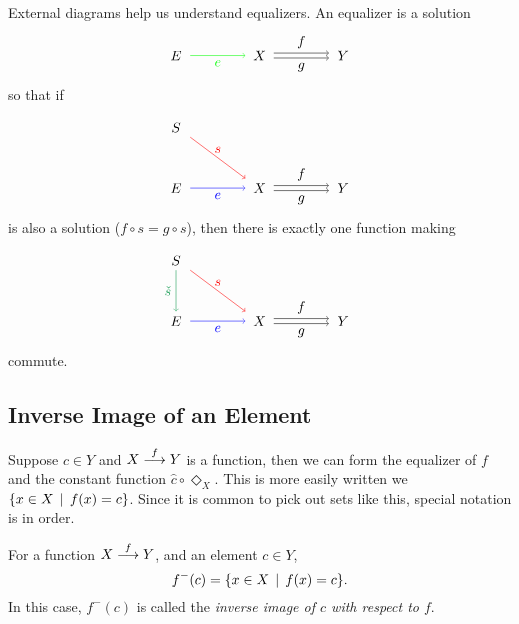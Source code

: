 External diagrams help us understand equalizers. 
An equalizer is a solution
\[
\begin{tikzpicture}
\matrix (m) [row sep=3em,column sep=4em,minimum width=2em]
{
	\node (E) {$E$}; & \node (A) {$X$}; & \node (B) {$Y$};\\
};
\draw[->, green] (E.east) -- node[anchor=north] {$e$} (A.west); 
\draw[->] (A.10) -- node[anchor=south]  {$f$} (B.170) ;
\draw[->] (A.350) -- node[anchor=north]  {$g$} (B.190);
\end{tikzpicture}
\]
so that if 
\[
\begin{tikzpicture}
\matrix (m) [row sep=3em,column sep=4em,minimum width=2em]
{
	\node (S) {$S$};\\
	\node (E) {$E$}; & \node (A) {$X$}; & \node (B) {$Y$};\\
};
\draw[->, red] (S.south east) -- node[anchor=south] {$s$} (A.north west);
\draw[->, blue] (E.east) -- node[anchor=north] {$e$} (A.west); 
\draw[->] (A.10) -- node[anchor=south]  {$f$} (B.170) ;
\draw[->] (A.350) -- node[anchor=north]  {$g$} (B.190);
\end{tikzpicture}
\]
is also a solution ($f\circ s=g\circ s$), then there is exactly one function making
\[
\begin{tikzpicture}
\matrix (m) [row sep=3em,column sep=4em,minimum width=2em]
{
	\node (S) {$S$};\\
	\node (E) {$E$}; & \node (A) {$X$}; & \node (B) {$Y$};\\
};
\draw[->,ForestGreen] (S.south) -- node[anchor=east] {$\check s$} (E.north);
\draw[->, red] (S.south east) -- node[anchor=south] {$s$} (A.north west);
\draw[->, blue] (E.east) -- node[anchor=north] {$e$} (A.west); 
\draw[->] (A.10) -- node[anchor=south]  {$f$} (B.170) ;
\draw[->] (A.350) -- node[anchor=north]  {$g$} (B.190);
\end{tikzpicture}
\]
commute.

\subsection*{Inverse Image of an Element}

Suppose $c\in Y$ and $\sfromto fXY$ is a function, then we can form the equalizer of $f$ and the constant function $\hat{c}\circ\Diamond_X$.
This is more easily written we $\{x\in X\st f(x)=c\}$.
Since it is common to pick out sets like this, special notation is in order.

\begin{defn}\label{def:inverse-image}
	For a function $\sfromto fXY$, and an element $c\in Y$, 
	\[f^-(c) = \{x\in X\st f(x)=c\}.\] 
	In this case, $f^-(c)$ is called the \emph{inverse image of $c$ with respect to $f$}.
\end{defn}

